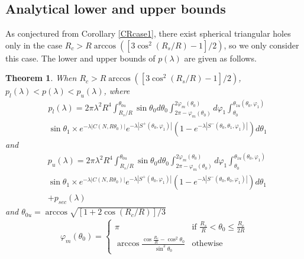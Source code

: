 \documentclass[journal, twoside]{IEEEtran}
\newtheorem{theorem}{Theorem}
\begin{document}
\subsection{Analytical lower and upper bounds} \label{secboundcase2}

As conjectured from Corollary \ref{CRcase1}, there exist spherical
triangular holes only in the case $R_c > R \arccos ([3\cos^2(R_s/R)-1]/2)$, 
so we only consider this case. The lower and upper bounds of $p(\lambda)$
are given as follows.

\begin{theorem} \label{trihole2}
	When $R_c > R \arccos([3\cos^2(R_s/R)-1]/2)$, 
	$p_l(\lambda) < p(\lambda) < p_u(\lambda)$,
	where 
	\begin{equation} \label{eqlower1}
	  \begin{split}
	  	    & p_l (\lambda) = 2\pi\lambda ^2 R^4\int_{R_s/R}^{\theta_{0u}} \sin \theta_0 d\theta_0 \int_{2\pi - \varphi_m(\theta_0)}^{2\varphi_m(\theta_0)} d\varphi_1 \int_{\theta_0}^{\theta_{1u}(\theta_0, \varphi_1)}  \\
	  	    & \sin \theta_1\times e^{-\lambda |C(N, R\theta_0)|} e^{-\lambda |S^+(\theta_0, \varphi_1)|}
	  	    (1 - e^{-\lambda |S^-(\theta_0, \theta_1, \varphi_1)|})d\theta_1
	  \end{split}
	\end{equation}
	and
	\begin{equation} \label{equpper1}
	  \begin{split}
	  	   &p_u (\lambda) =  2\pi\lambda ^2 R^4\int_{R_s/R}^{\theta_{0u}} \sin \theta_0 d\theta_0 \int_{2\pi - \varphi_m(\theta_0)}^{2\varphi_m(\theta_0)} d\varphi_1 \int_{\theta_0}^{\theta_{1u}(\theta_0, \varphi_1)} \\
	  	   & \sin \theta_1\times e^{-\lambda |C(N, R\theta_0)|} e^{-\lambda |S^+(\theta_0, \varphi_1)|}
	  	   	 (1 - e^{-\lambda |S^-(\theta_0, \theta_0, \varphi_1)|})d\theta_1 \\
	  	    & + p_{sec}(\lambda)
	  \end{split}
	\end{equation}
	and
	$\theta_{0u} = \arccos \sqrt{[1+2\cos(R_c/R)]/3}$
	  \begin{eqnarray} \label{eqphim}
		  \varphi_m(\theta_0) = 
		  \begin{cases}
			  \pi & \text{if $\frac{R_s}{R} < \theta_0 \leq \frac{R_c}{2R}$} \\
			  \arccos \frac{\cos\frac{R_c}{R} - \cos^2 \theta_0}{\sin^2 \theta_0} & \text{othewise}
		  \end{cases}

\end{eqnarray}
\end{theorem}
\end{document}
